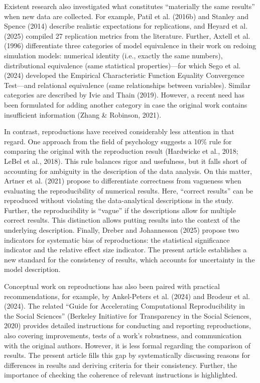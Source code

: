 \documentclass[authordate, empirical]{jote-new-article}
\begin{document}
	Existent research also investigated what constitutes “materially the same results” when new data are collected. For example, Patil et al. (2016b) and Stanley and Spence (2014) describe realistic expectations for replications, and Heyard et al. (2025) compiled 27 replication metrics from the literature. Further, Axtell et al. (1996) differentiate three categories of model equivalence in their work on redoing simulation models: numerical identity (i.e., exactly the same numbers), distributional equivalence (same statistical properties)—for which Sego et al. (2024) developed the Empirical Characteristic Function Equality Convergence Test—and relational equivalence (same relationships between variables). Similar categories are described by Ivie and Thain (2019). However, a recent need has been formulated for adding another category in case the original work contains insufficient information (Zhang \& Robinson, 2021).



	In contrast, reproductions have received considerably less attention in that regard. One approach from the field of psychology suggests a 10\% rule for comparing the original with the reproduction result (Hardwicke et al., 2018; LeBel et al., 2018). This rule balances rigor and usefulness, but it falls short of accounting for ambiguity in the description of the data analysis. On this matter, Artner et al. (2021) propose to differentiate correctness from vagueness when evaluating the reproducibility of numerical results. Here, “correct results” can be reproduced without violating the data-analytical descriptions in the study. Further, the reproducibility is “vague” if the descriptions allow for multiple correct results. This distinction allows putting results into the context of the underlying description. Finally, Dreber and Johannesson (2025) propose two indicators for systematic bias of reproductions: the statistical significance indicator and the relative effect size indicator. The present article establishes a new standard for the consistency of results, which accounts for uncertainty in the model description.



	Conceptual work on reproductions has also been paired with practical recommendations, for example, by Ankel-Peters et al. (2024) and Brodeur et al. (2024). The related “Guide for Accelerating Computational Reproducibility in the Social Sciences” (Berkeley Initiative for Transparency in the Social Sciences, 2020) provides detailed instructions for conducting and reporting reproductions, also covering improvements, tests of a work's robustness, and communication with the original authors. However, it is less formal regarding the comparison of results. The present article fills this gap by systematically discussing reasons for differences in results and deriving criteria for their consistency. Further, the importance of checking the coherence of relevant instructions is highlighted.
\end{document}
